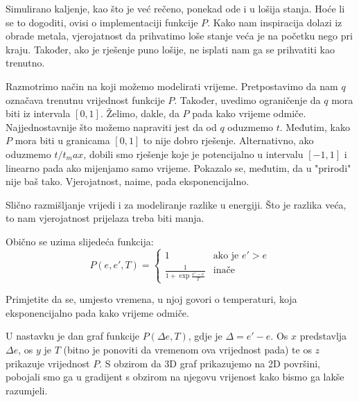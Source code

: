 \documentclass[times, utf8, zavrsni]{fer}
\begin{document}
Simulirano kaljenje, kao što je već rečeno, ponekad ode i u lošija
stanja. Hoće li se to dogoditi, ovisi o implementaciji funkcije
$P$. Kako nam inspiracija dolazi iz obrade metala, vjerojatnost da
prihvatimo loše stanje veća je na početku nego pri kraju. Također,
ako je rješenje puno lošije, ne isplati nam ga se prihvatiti kao
trenutno. 

Razmotrimo način na koji možemo modelirati vrijeme. Pretpostavimo
da nam $q$ označava trenutnu vrijednost funkcije $P$. Također,
uvedimo ograničenje da $q$ mora biti iz intervala $[0, 1]$.
Želimo, dakle, da $P$ pada kako vrijeme odmiče. Najjednostavnije
što možemo napraviti jest da od $q$ oduzmemo $t$. Međutim,
kako $P$ mora biti u granicama $[0, 1]$ to nije dobro rješenje.
Alternativno, ako oduzmemo $t/t_max$, dobili smo rješenje koje
je potencijalno u intervalu $[-1, 1]$ i linearno pada
ako mijenjamo samo vrijeme. Pokazalo se, međutim, da u "prirodi"
nije baš tako. Vjerojatnost, naime, pada eksponencijalno. 

Slično razmišljanje vrijedi i za modeliranje razlike u energiji.
Što je razlika veća, to nam vjerojatnost prijelaza treba biti manja.

Obično se uzima slijedeća funkcija: 
$$
P(e, e', T) = 
\left\{ \begin{array}{ll}
	1 & \mbox{ako je } e' > e \\
	\frac{1}{1+\exp \frac{e'-e}{T}} & \mbox{inače}
\end{array} \right.
$$

Primjetite da se, umjesto vremena, u njoj govori o temperaturi,
koja eksponencijalno pada kako vrijeme odmiče. 

U nastavku je dan graf funkcije $P(\Delta e, T)$, gdje je $\Delta = e'-e$. Os
$x$ predstavlja $\Delta e$, os $y$ je $T$ (bitno je ponoviti da
vremenom ova vrijednost pada) te os $z$ prikazuje vrijednost $P$. 
S obzirom da 3D graf prikazujemo na 2D površini, pobojali smo ga
u gradijent s obzirom na njegovu vrijenost kako bismo ga lakše 
razumjeli. 
\end{document}
